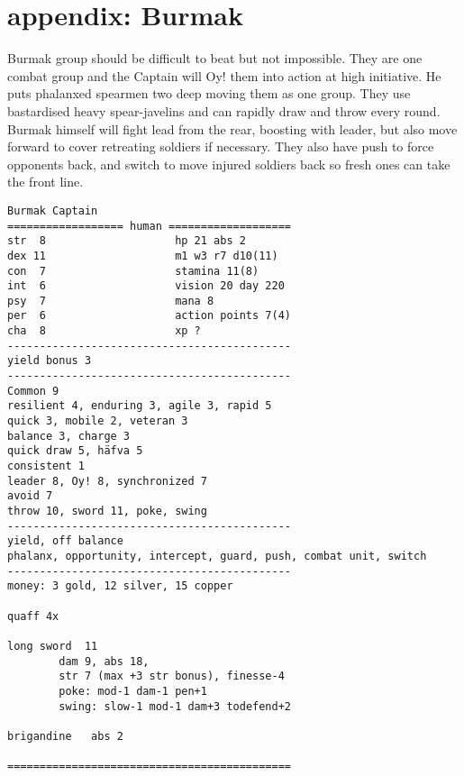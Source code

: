 \section*{appendix: Burmak}

\raggedbottom

Burmak group should be difficult to beat but not impossible. They are one combat group and the Captain will Oy! them into action at high initiative. He puts phalanxed spearmen two deep moving them as one group. They use bastardised heavy spear-javelins and can rapidly draw and throw every round. Burmak himself will fight lead from the rear, boosting with leader, but also move forward to cover retreating soldiers if necessary. They also have push to force opponents back, and switch to move injured soldiers back so fresh ones can take the front line.


\goodbreak \small \begin{samepage} \begin{verbatim}
Burmak Captain
================== human ===================
str  8                    hp 21 abs 2
dex 11                    m1 w3 r7 d10(11)
con  7                    stamina 11(8)
int  6                    vision 20 day 220
psy  7                    mana 8
per  6                    action points 7(4)
cha  8                    xp ?
--------------------------------------------
yield bonus 3
--------------------------------------------
Common 9
resilient 4, enduring 3, agile 3, rapid 5
quick 3, mobile 2, veteran 3
balance 3, charge 3
quick draw 5, häfva 5
consistent 1
leader 8, Oy! 8, synchronized 7
avoid 7
throw 10, sword 11, poke, swing
--------------------------------------------
yield, off balance
phalanx, opportunity, intercept, guard, push, combat unit, switch
--------------------------------------------
money: 3 gold, 12 silver, 15 copper

quaff 4x

long sword  11
        dam 9, abs 18,
        str 7 (max +3 str bonus), finesse-4
        poke: mod-1 dam-1 pen+1
        swing: slow-1 mod-1 dam+3 todefend+2
        
brigandine   abs 2

============================================
\end{verbatim} \end{samepage} \normalsize

\

